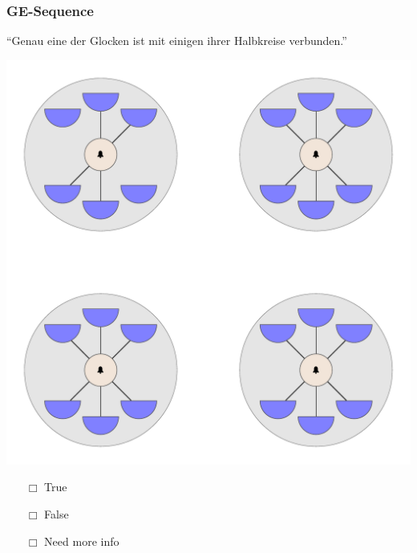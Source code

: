 \documentclass[fleqn,10pt,serif,xcolor=dvipsnames]{beamer}
\newcommand{\GE}{GE}
\newcommand{\mymark}[1]{{\color{blue}{#1}}}
\begin{document}
\begin{frame}
  \frametitle{\GE-Sequence}
  \begin{center}
    ``Genau eine der Glocken ist mit einigen ihrer Halbkreise verbunden.''

    \vspace{0.1cm}

    \includegraphics[width=0.5 \textwidth]{../../pictures/ge_01_5.pdf}

    \vspace{0.1cm}

    \begin{multicols}{3}
      \begin{itemize} 
      \item[$\Box$] True\\
        \onslide<2>{$\leadsto$  \mymark{local}}
      \item[$\Box$] False\\
        \onslide<2>{$\leadsto$ \mymark{false}}
      \item[$\Box$] Need more info 
      \end{itemize}
    \end{multicols}

  \end{center}
\end{frame}
\end{document}
